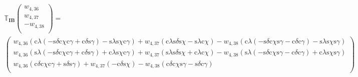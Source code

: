 \begin{gather} \label{eq:DandTInertial}
\mathbb{T}_{\mathbf{IB}}
\begin{pmatrix}
w_{4,36}\\
w_{4,37}\\
-w_{4,38}\\
\end{pmatrix}
= \nonumber \\
\left(
\begin{matrix}
w_{4,36}\left( \text{c}\lambda\left(-\text{s}\delta \text{c}\chi \text{c}\gamma +\text{c}\delta \text{s}\gamma \right)-\text{s}\lambda \text{s}\chi \text{c}\gamma \right)  +w_{4,37} \left( \text{c}\lambda \text{s}\delta \text{s}\chi -\text{s}\lambda \text{c}\chi\right)  -w_{4,38} \left( \text{c}\lambda\left(-\text{s}\delta \text{c}\chi \text{s}\gamma -\text{c}\delta \text{c}\gamma \right)-\text{s}\lambda \text{s}\chi \text{s}\gamma \right) \\
w_{4,36} \left( \text{s}\lambda\left(-\text{s}\delta \text{c}\chi \text{c}\gamma +\text{c}\delta \text{s}\gamma \right)+\text{c}\lambda \text{s}\chi \text{c}\gamma \right) +w_{4,37} \left( \text{s}\lambda \text{s}\delta \text{s}\chi +\text{c}\lambda \text{c}\chi \right)  -w_{4,38} \left( \text{s}\lambda\left(-\text{s}\delta \text{c}\chi \text{s}\gamma -\text{c}\delta \text{c}\gamma \right)+\text{c}\lambda \text{s}\chi \text{s}\gamma \right) \\
w_{4,36} \left( \text{c}\delta \text{c}\chi \text{c}\gamma +\text{s}\delta \text{s}\gamma\right) + w_{4,37} \left(  -\text{c}\delta \text{s}\chi \right) -w_{4,38} \left(  \text{c}\delta \text{c}\chi \text{s}\gamma -\text{s}\delta \text{c}\gamma \right) \\
\end{matrix}
\right)
\end{gather}

